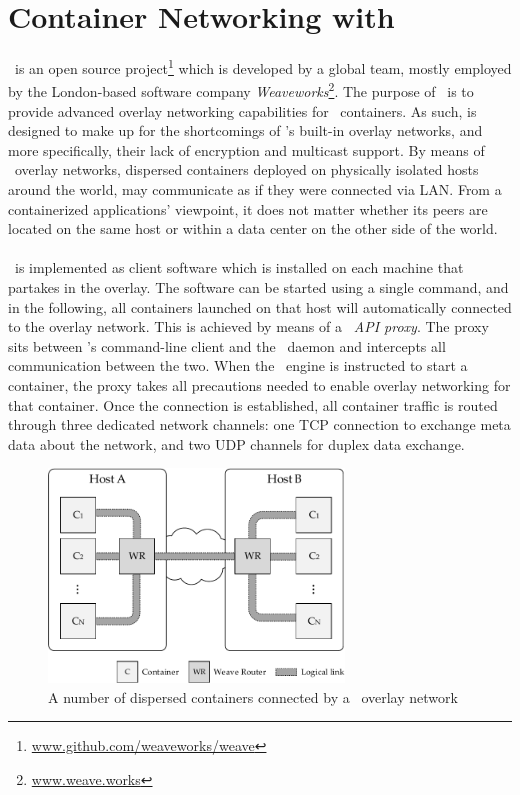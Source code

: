 
\section{Container Networking with \wnet}
\wnet\ is an open source project\footnote{\url{www.github.com/weaveworks/weave}} which is developed by a global team, mostly employed by the London-based software company \emph{Weaveworks}\footnote{\url{www.weave.works}}. The purpose of \wnet\ is to provide advanced overlay networking capabilities for \docker\ containers. As such, is designed to make up for the shortcomings of \docker 's built-in overlay networks, and more specifically, their lack of encryption and multicast support. By means of \weave\ overlay networks, dispersed containers deployed on physically isolated hosts around the world, may communicate as if they were connected via LAN. From a containerized applications' viewpoint, it does not matter whether its peers are located on the same host or within a data center on the other side of the world. 

\paragraph{}

\wnet\ is implemented as client software which is installed on each machine that partakes in the overlay. The software can be started using a single command, and in the following, all containers launched on that host will automatically connected to the overlay network. This is achieved by means of a \emph{\docker\ API proxy}. The proxy sits between \docker 's command-line client and the \docker\ daemon and intercepts all communication between the two. When the \docker\ engine is instructed to start a container, the proxy takes all precautions needed to enable overlay networking for that container. Once the connection is established, all container traffic is routed through three dedicated network channels: one TCP connection to exchange meta data about the network, and two UDP channels for duplex data exchange.

\begin{figure}[htpb]
  \centering
  \includegraphics[width=0.7\textwidth]{figures/weave.pdf}
  \caption[An example of containers connected via \wnet\ overlay network]{A number of dispersed containers connected by a \wnet\ overlay network}\label{fig:weavescheme} 
\end{figure}

